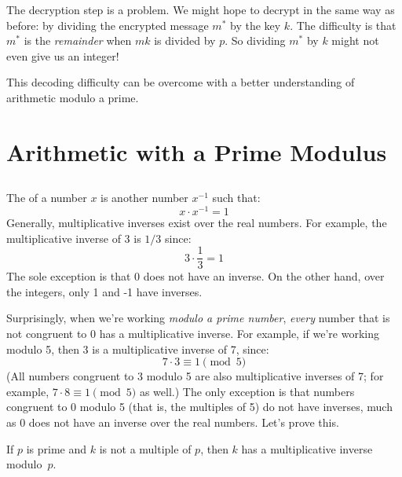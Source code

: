 The decryption step is a problem.  We might hope to decrypt in the
same way as before: by dividing the encrypted message $m^*$ by the key
$k$.  The difficulty is that $m^*$ is the \emph{remainder} when $mk$
is divided by $p$.  So dividing $m^*$ by $k$ might not even give us an
integer!

This decoding difficulty can be overcome with a better understanding
of arithmetic modulo a prime.

\begin{problems}
\classproblems
{}
\end{problems}

\section{Arithmetic with a Prime Modulus}\label{mod_prime_sec}

\subsection{}
\label{sec:prime}

The  of a number $x$ is another number
$x^{-1}$ such that:
%
\[
x \cdot x^{-1} = 1
\]
Generally, multiplicative inverses exist over the real numbers.  For
example, the multiplicative inverse of 3 is $1 / 3$ since:
%
\[
3 \cdot \frac{1}{3} = 1
\]
%
The sole exception is that 0 does not have an inverse.
On the other hand, over the integers, only 1 and -1 have inverses.

Surprisingly, when we're working \emph{modulo a prime number},
\emph{every} number that is not congruent to 0 has a multiplicative
inverse.  For example, if we're working modulo 5, then 3 is a
multiplicative inverse of 7, since:
%
\[
7 \cdot 3 \equiv 1 \pmod{5}
\]
%
(All numbers congruent to 3 modulo 5 are also multiplicative inverses
of 7; for example, $7 \cdot 8 \equiv 1 \pmod{5}$ as well.)  The only
exception is that numbers congruent to 0 modulo 5 (that is, the
multiples of 5) do not have inverses, much as 0 does not have an
inverse over the real numbers.  Let's prove this.

\begin{lemma}
\label{lem:inverses}
If $p$ is prime and $k$ is not a multiple of $p$, then $k$ has a
multiplicative inverse modulo~$p$.
\end{lemma}

